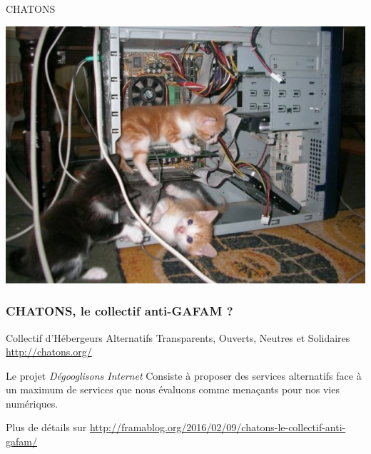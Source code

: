 \documentclass{beamer}
\begin{document}
\begin{frame}
\Huge{\centerline{CHATONS}}
\begin{center}
\includegraphics[scale=0.5]{./images/Cute-Kittens-In-Computer-Case.jpg}
\end{center}
\end{frame}

\begin{frame}
\frametitle{CHATONS, le collectif anti-GAFAM ?}
Collectif d'Hébergeurs Alternatifs Transparents, Ouverts, Neutres et Solidaires \url{http://chatons.org/}

\begin{block}{Le projet \emph{Dégooglisons Internet} }
Consiste à proposer des services alternatifs face à un maximum de services que nous évaluons comme menaçants pour nos vies numériques.
\end{block}
Plus de détails sur \url{http://framablog.org/2016/02/09/chatons-le-collectif-anti-gafam/}

\end{frame}
\end{document}
